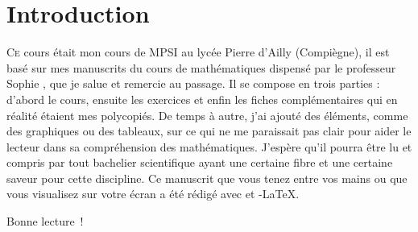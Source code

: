\chapter*{Introduction}

\lettrine[lines=2, lhang=0.33, loversize=0.25]{C}{e} cours était mon cours de MPSI au lycée Pierre d'Ailly (Compiègne), il est basé sur mes manuscrits du cours de mathématiques dispensé par le professeur Sophie , que je salue et remercie au passage. Il se compose en trois parties : d'abord le cours, ensuite les exercices et enfin les fiches complémentaires qui en réalité étaient mes polycopiés. De temps à autre, j'ai ajouté des éléments, comme des graphiques ou des tableaux, sur ce qui ne me paraissait pas clair pour aider le lecteur dans sa compréhension des mathématiques. J'espère qu'il pourra être lu et compris par tout bachelier scientifique ayant une certaine fibre et une certaine saveur pour cette discipline. Ce manuscrit que vous tenez entre vos mains ou que vous visualisez sur votre écran a été rédigé avec \LaTeXe{} et \AmS-\LaTeX{}.

Bonne lecture~!

